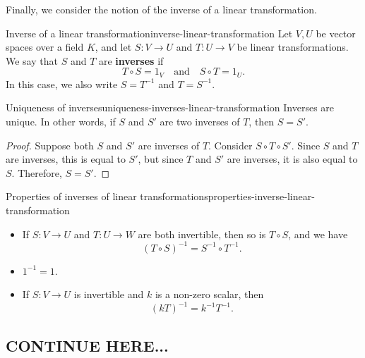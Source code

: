 Finally, we consider the notion of the inverse of a linear
transformation.

\begin{definition}{Inverse of a linear transformation}{inverse-linear-transformation}
  Let $V,U$ be vector spaces over a field $K$, and let $S:V\to U$ and
  $T:U\to V$ be linear transformations.  We say that $S$ and $T$ are
  \textbf{inverses}%
   if
  \begin{equation*}
    T\circ S = 1_V
    \quad\mbox{and}\quad
    S\circ T = 1_U.
  \end{equation*}
  In this case, we also write $S=T^{-1}$ and $T=S^{-1}$.  
\end{definition}

\begin{proposition}{Uniqueness of inverses}{uniqueness-inverses-linear-transformation}
  Inverses are unique. In other words, if $S$ and $S'$ are two inverses
  of $T$, then $S=S'$.
\end{proposition}

\begin{proof}
  Suppose both $S$ and $S'$ are inverses of $T$. Consider
  $S\circ T\circ S'$. Since $S$ and $T$ are inverses, this is equal to
  $S'$, but since $T$ and $S'$ are inverses, it is also equal to
  $S$. Therefore, $S=S'$.
\end{proof}

\begin{proposition}{Properties of inverses of linear transformations}{properties-inverse-linear-transformation}
  \begin{itemize}
  \item If $S:V\to U$ and $T:U\to W$ are both invertible, then so is
    $T\circ S$, and we have
    \begin{equation*}
      (T\circ S)^{-1} = S^{-1}\circ T^{-1}.
    \end{equation*}
  \item $1^{-1} = 1$.
  \item If $S:V\to U$ is invertible and $k$ is a non-zero scalar, then
    \begin{equation*}
      (kT)^{-1} = k^{-1}T^{-1}.
    \end{equation*}
  \end{itemize}
\end{proposition}

\subsection{CONTINUE HERE...}

